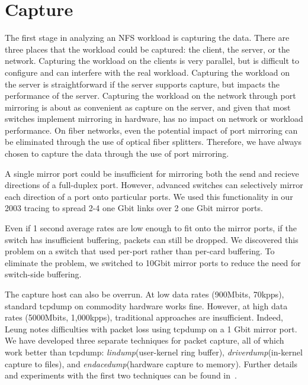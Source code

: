 \section{Capture}
\label{sec:capture}

The first stage in analyzing an NFS workload is capturing the data.
There are three places that the workload could be captured: the
client, the server, or the network.  Capturing the workload on the
clients is very parallel, but is difficult to configure and can
interfere with the real workload.  Capturing the workload on the
server is straightforward if the server supports capture, 
but impacts the performance of the
server.  Capturing the workload on the network through port mirroring
is about as convenient as capture on the server, and given that most
switches implement mirroring in hardware, has no impact on network or
workload performance.  On fiber networks, even the potential impact of
port mirroring can be eliminated through the use of optical fiber
splitters. Therefore, we have always chosen to capture the
data through the use of port mirroring.

A single mirror port could be insufficient for mirroring both the send
and recieve directions of a full-duplex port.  However, advanced
switches can selectively mirror each direction of a port onto
particular ports.  We used this functionality in our 2003 tracing to
spread 2-4 one Gbit links over 2 one Gbit mirror ports.

Even if 1 second average rates are low enough to fit onto the mirror
ports, if the switch has insufficient buffering, packets can still be
dropped. We discovered this problem on a switch that used per-port
rather than per-card buffering.  To eliminate the problem, we switched
to 10Gbit mirror ports to reduce the need for switch-side buffering.

The capture host can also be overrun. At low data rates (900Mbits,
70kpps), standard tcpdump on commodity hardware works fine.
However, at high data rates (5000Mbits, 1,000kpps),
traditional approaches are insufficient. Indeed,
Leung\cite{LeungUsenix08} notes
difficulties with packet loss using tcpdump on a 1 Gbit mirror port.
We have developed three separate techniques for packet capture, all of
which work better than tcpdump: {\it lindump}(user-kernel ring
buffer), {\it driverdump}(in-kernel capture to files), and {\it
endacedump}(hardware capture to memory).  Further details and
experiments with the first two techniques can be found
in~\cite{Anderson06network-tracing}.

